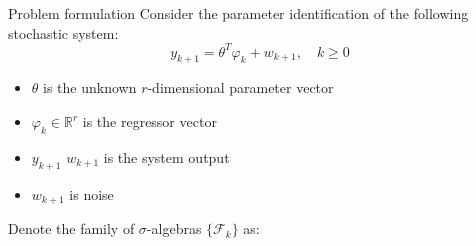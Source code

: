\documentclass{beamer}
\begin{document}
	
	\begin{frame}{Problem formulation}
	\tiny
	Consider the parameter identification of the following stochastic system:
\[
y_{k + 1} = \theta^{T}\varphi_{k} + w_{k + 1}, \quad k \geq 0 \tag{1}
\]
\begin{itemize}
 \item $\theta$ is the unknown $r$-dimensional parameter vector
 \item $\varphi_{k} \in \mathbb{R}^{r}$ is the regressor vector
 \item $y_{k + 1}$ $w_{k + 1}$ is the system output 
 \item $w_{k+1}$  is noise
 \end{itemize}

Denote the family of $\sigma$-algebras $\{\mathcal{F}_{k}\}$ as:
%

%
%
	\end{frame}
\end{document}

